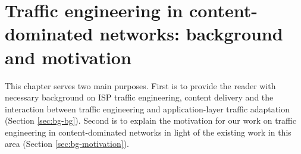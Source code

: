 \chapter{Traffic engineering in content-dominated networks: background and motivation}
\label{ch:te-background}

This chapter serves two main purposes. First is to provide the reader with necessary background on ISP traffic engineering, content delivery and the interaction between traffic engineering and application-layer traffic adaptation (Section \ref{sec:bg-bg}). Second is to explain the motivation for our work on traffic engineering in content-dominated networks in light of the existing work in this area (Section \ref{sec:bg-motivation}).




%






